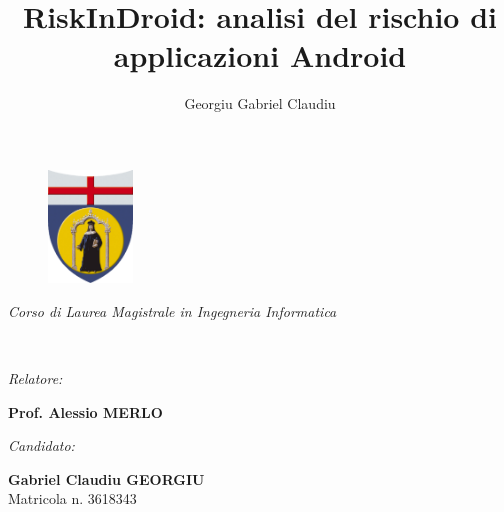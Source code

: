 \documentclass[12pt,a4paper,oneside]{article}
\author{Georgiu Gabriel Claudiu}
\title{RiskInDroid: analisi del rischio di applicazioni Android}
\begin{document}
\thispagestyle{empty}
\begin{spacing}{1.3}
	\begin{center}
		\noindent{}
		\noindent{}	
		
		\begin{figure}[!htb]
			\centering
			\includegraphics[height=30mm]{resources/logo.png}
		\end{figure}
	
		\begin{minipage}[!htb]{\textwidth}
			\begin{singlespace}
				\begin{center}
					{\itshape Corso di Laurea Magistrale in Ingegneria Informatica} 
				\end{center}
			\end{singlespace}
		\end{minipage}
		
		\noindent\hrulefill\\
		
		\vfill
		
		\noindent{}
	\end{center}
	
	\vfill
	
	\noindent\begin{minipage}[t]{\textwidth-5.9cm}
		\textit{Relatore:}
		\begin{singlespace}
			\textbf{Prof. Alessio MERLO}\\
		\end{singlespace}
	\end{minipage}%
	\noindent\begin{minipage}[t]{5.8cm}
		\textit{Candidato:}		
		\begin{singlespace}
			\textbf{Gabriel Claudiu GEORGIU}\\
			Matricola n. 3618343
		\end{singlespace}
	\end{minipage}%
	
	\vspace{2cm}
	
	\begin{center}
		\noindent\hrulefill\\
		\noindent{}
	\end{center}	
\end{spacing}
\newpage
\end{document}
